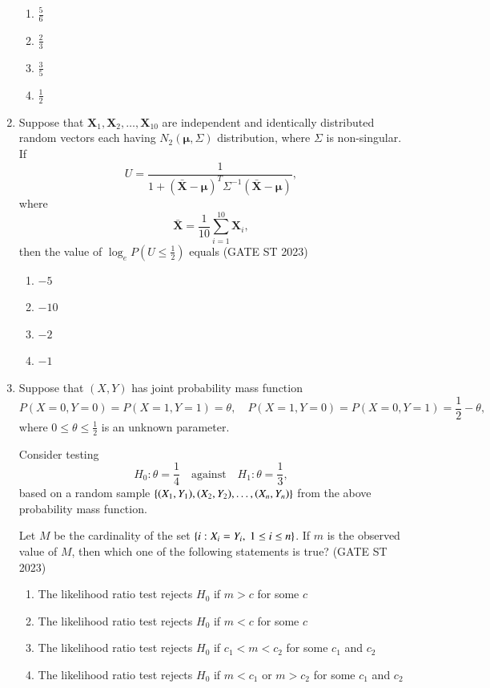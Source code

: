 \documentclass[journal]{IEEEtran}
\begin{document}
\begin{enumerate}[label=\textbf{Q.\arabic*.}, start=11, align=left, itemsep=2em]
\begin{enumerate}
\item $\frac{5}{6}$
\item $\frac{2}{3}$
\item $\frac{3}{5}$
\item $\frac{1}{2}$
\end{enumerate}

\item Suppose that $\mathbf{X}_1, \mathbf{X}_2, \dots, \mathbf{X}_{10}$ are independent and identically distributed random 
vectors each having $N_2(\boldsymbol{\mu}, \Sigma)$ distribution, where $\Sigma$ is non-singular.  
If  
\[
U = \frac{1}{1 + (\bar{\mathbf{X}} - \boldsymbol{\mu})^{T} \Sigma^{-1} (\bar{\mathbf{X}} - \boldsymbol{\mu})},
\]
where  
\[
\bar{\mathbf{X}} = \frac{1}{10} \sum_{i=1}^{10} \mathbf{X}_i,
\]
then the value of $\log_e P\left(U \le \frac{1}{2}\right)$ equals  \hfill(GATE ST 2023)

\begin{enumerate}
    \item $-5$
    \item $-10$
    \item $-2$
    \item $-1$
\end{enumerate}


\item Suppose that $(X, Y)$ has joint probability mass function
\[
P(X = 0, Y = 0) = P(X = 1, Y = 1) = \theta, \quad
P(X = 1, Y = 0) = P(X = 0, Y = 1) = \frac12 - \theta,
\]
where $0 \le \theta \le \frac12$ is an unknown parameter.  

Consider testing  
\[
H_0: \theta = \frac14 \quad \text{against} \quad H_1: \theta = \frac13,
\]
based on a random sample $\left\{(X_1, Y_1), (X_2, Y_2), \dots, (X_n, Y_n)\right\}$ from the above probability mass function.  

Let $M$ be the cardinality of the set $\left\{ i : X_i = Y_i, \ 1 \le i \le n \right\}$.  
If $m$ is the observed value of $M$, then which one of the following statements is true? \hfill(GATE ST 2023) 

\begin{enumerate}
    \item The likelihood ratio test rejects $H_0$ if $m > c$ for some $c$
    \item The likelihood ratio test rejects $H_0$ if $m < c$ for some $c$
    \item The likelihood ratio test rejects $H_0$ if $c_1 < m < c_2$ for some $c_1$ and $c_2$
    \item The likelihood ratio test rejects $H_0$ if $m < c_1$ or $m > c_2$ for some $c_1$ and $c_2$
\end{enumerate}


\end{enumerate}
\end{document}
